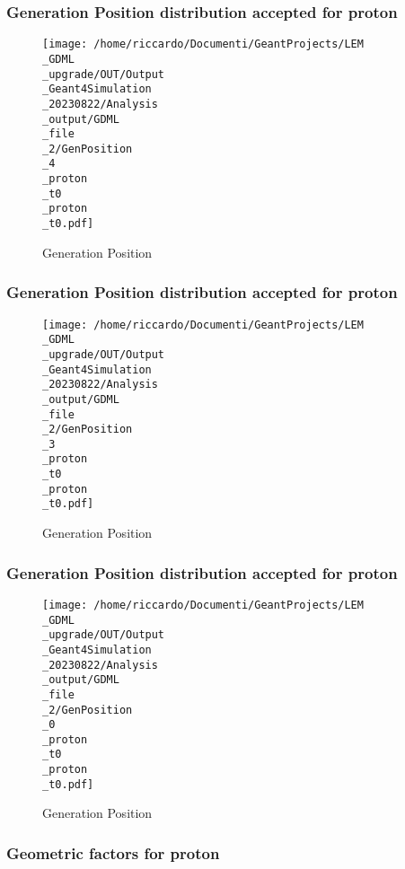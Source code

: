 \documentclass[8pt]{beamer}
\begin{document}
            \begin{frame}
                \frametitle{Generation Position distribution accepted for proton}
            
        \begin{figure}[h]
            \centering
            \texttt{[image: /home/riccardo/Documenti/GeantProjects/LEM\\\_GDML\\\_upgrade/OUT/Output\\\_Geant4Simulation\\\_20230822/Analysis\\\_output/GDML\\\_file\\\_2/GenPosition\\\_4\\\_proton\\\_t0\\\_proton\\\_t0.pdf]}
            \caption{Generation Position}
        \end{figure}
        
            \end{frame}
            
            \begin{frame}
                \frametitle{Generation Position distribution accepted for proton}
            
        \begin{figure}[h]
            \centering
            \texttt{[image: /home/riccardo/Documenti/GeantProjects/LEM\\\_GDML\\\_upgrade/OUT/Output\\\_Geant4Simulation\\\_20230822/Analysis\\\_output/GDML\\\_file\\\_2/GenPosition\\\_3\\\_proton\\\_t0\\\_proton\\\_t0.pdf]}
            \caption{Generation Position}
        \end{figure}
        
            \end{frame}
            
            \begin{frame}
                \frametitle{Generation Position distribution accepted for proton}
            
        \begin{figure}[h]
            \centering
            \texttt{[image: /home/riccardo/Documenti/GeantProjects/LEM\\\_GDML\\\_upgrade/OUT/Output\\\_Geant4Simulation\\\_20230822/Analysis\\\_output/GDML\\\_file\\\_2/GenPosition\\\_0\\\_proton\\\_t0\\\_proton\\\_t0.pdf]}
            \caption{Generation Position}
        \end{figure}
        
            \end{frame}
            
            \begin{frame}
                \frametitle{Geometric factors for proton}
            
            \end{frame}
            
\end{document}
